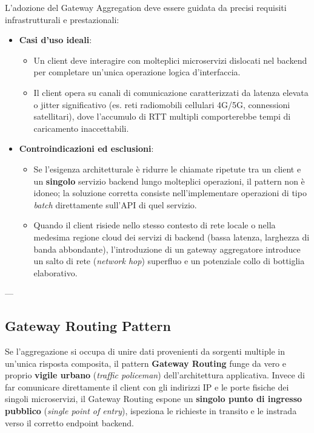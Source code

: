 \documentclass[11pt, a4paper]{article}
\begin{document}
L'adozione del Gateway Aggregation deve essere guidata da precisi requisiti infrastrutturali e prestazionali:
\begin{itemize}[noitemsep]
    \item \textbf{Casi d'uso ideali}:
    \begin{itemize}[noitemsep]
        \item Un client deve interagire con molteplici microservizi dislocati nel backend per completare un'unica operazione logica d'interfaccia.
        \item Il client opera su canali di comunicazione caratterizzati da latenza elevata o jitter significativo (es. reti radiomobili cellulari 4G/5G, connessioni satellitari), dove l'accumulo di RTT multipli comporterebbe tempi di caricamento inaccettabili.
    \end{itemize}
    \item \textbf{Controindicazioni ed esclusioni}:
    \begin{itemize}[noitemsep]
        \item Se l'esigenza architetturale è ridurre le chiamate ripetute tra un client e un \textbf{singolo} servizio backend lungo molteplici operazioni, il pattern non è idoneo; la soluzione corretta consiste nell'implementare operazioni di tipo \emph{batch} direttamente sull'API di quel servizio.
        \item Quando il client risiede nello stesso contesto di rete locale o nella medesima regione cloud dei servizi di backend (bassa latenza, larghezza di banda abbondante), l'introduzione di un gateway aggregatore introduce un salto di rete (\emph{network hop}) superfluo e un potenziale collo di bottiglia elaborativo.
    \end{itemize}
\end{itemize}

---

\subsection{Gateway Routing Pattern}

Se l'aggregazione si occupa di unire dati provenienti da sorgenti multiple in un'unica risposta composita, il pattern \textbf{Gateway Routing} funge da vero e proprio \textbf{vigile urbano} (\emph{traffic policeman}) dell'architettura applicativa. Invece di far comunicare direttamente il client con gli indirizzi IP e le porte fisiche dei singoli microservizi, il Gateway Routing espone un \textbf{singolo punto di ingresso pubblico} (\emph{single point of entry}), ispeziona le richieste in transito e le instrada verso il corretto endpoint backend.
\end{document}
